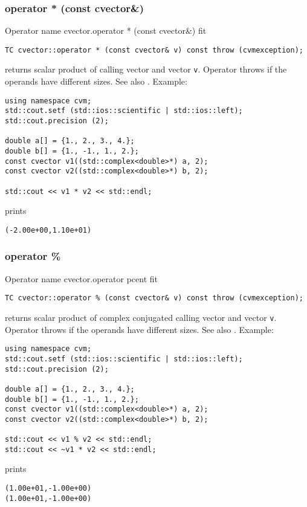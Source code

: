 \subsubsection{operator * (const cvector\&)}
Operator%
\pdfdest name {cvector.operator * (const cvector&)} fit
\begin{verbatim}
TC cvector::operator * (const cvector& v) const throw (cvmexception);
\end{verbatim}
returns  scalar product of  calling vector and  vector \verb"v".
Operator throws 
if the operands have different sizes.
See also .
Example:
\begin{Verbatim}
using namespace cvm;
std::cout.setf (std::ios::scientific | std::ios::left);
std::cout.precision (2);

double a[] = {1., 2., 3., 4.};
double b[] = {1., -1., 1., 2.};
const cvector v1((std::complex<double>*) a, 2);
const cvector v2((std::complex<double>*) b, 2);

std::cout << v1 * v2 << std::endl;
\end{Verbatim}
prints
\begin{Verbatim}
(-2.00e+00,1.10e+01)
\end{Verbatim}
\newpage



\subsubsection{operator \%}
Operator%
\pdfdest name {cvector.operator pcent} fit
\begin{verbatim}
TC cvector::operator % (const cvector& v) const throw (cvmexception);
\end{verbatim}
returns  scalar product of  complex conjugated
calling vector and  vector \verb"v".
Operator throws 
if the operands have different sizes.
See also .
Example:
\begin{Verbatim}
using namespace cvm;
std::cout.setf (std::ios::scientific | std::ios::left);
std::cout.precision (2);

double a[] = {1., 2., 3., 4.};
double b[] = {1., -1., 1., 2.};
const cvector v1((std::complex<double>*) a, 2);
const cvector v2((std::complex<double>*) b, 2);

std::cout << v1 % v2 << std::endl;
std::cout << ~v1 * v2 << std::endl;
\end{Verbatim}
prints
\begin{Verbatim}
(1.00e+01,-1.00e+00)
(1.00e+01,-1.00e+00)
\end{Verbatim}
\newpage



